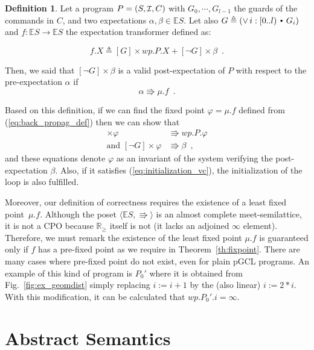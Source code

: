 \documentclass{eptcs}
\theoremstyle{plain}
\theoremstyle{definition}
\newtheorem{definition}[theorem]{Definition}
\newcommand{\Real}{\ensuremath{\mathbb R}}
\newcommand{\RealPos}{\ensuremath{\Real_\geq}}
\newcommand{\lit}[1]{\ensuremath{\mathit{#1}}}
\newcommand{\Init}{\mbox{\small\ensuremath{\mathcal{I}}}}
\newcommand{\totype}{\ensuremath{\ra}}
\newcommand{\ES}{\lit{\mathbb{E}S}}
\newcommand{\Def}{\ensuremath{\triangleq}}
\newcommand{\ra}{\ensuremath{\rightarrow}}
\newcommand{\dotsep}{\mbox{\raisebox{0.4ex}{\tiny\ensuremath{\:\;\bullet\;\:}}}}
\newcommand{\Not}{\ensuremath{\neg}}
\newcommand{\Wp}{\lit{wp}}
\newcommand{\elq}{\ensuremath{\Rrightarrow}}
\newcommand{\noi}[0]{\noindent}
\begin{document}
\begin{definition}
  Let a program $P = (S, \Init, C)$ with $G_0,\cdots, G_{l-1}$ the guards of the
  commands in $C$, and two expectations $\alpha, \beta \in \ES$. Let also $G \Def (\vee
  \, i : [0..l) \dotsep G_i)$ and $f : \ES \totype \ES$ the expectation
    transformer defined as:

  \begin{equation} \label{eq:back_propag_def}
    f.X \Def [G] \times \Wp.P.X + [\Not G] \times \beta \enspace.
  \end{equation}


  \noi Then, we said that $[\Not G]\times\beta$ is a valid \mbox{post-expectation} of $P$ with
  respect to the \mbox{pre-expectation} $\alpha$ if
  \begin{equation} \label{eq:initialization_vc}
    \alpha \elq \mu.f \enspace.
  \end{equation}
\end{definition}

\smallskip

Based on this definition, if we can find the fixed point $\varphi = \mu.f$
defined from (\ref{eq:back_propag_def}) then we can show that 
\begin{align*}
            [G] \times \varphi &\elq \Wp.P.\varphi\\
\text{and } [\Not G] \times \varphi &\elq \beta \enspace,
\end{align*}
and these equations denote $\varphi$ as an invariant of
the system verifying the \mbox{post-expectation} $\beta$. Also, if it
satisfies (\ref{eq:initialization_vc}), the initialization of the loop
is also fulfilled.

\smallskip
Moreover, our definition of correctness requires the existence of a least fixed
point~$\mu.f$. Although the poset $\langle \ES, \elq \rangle$ is an almost
complete \mbox{meet-semilattice}, it is not a CPO because $\RealPos$ itself is not
(it lacks an adjoined $\infty$ element). Therefore, we must remark the
existence of the least fixed point $\mu.f$ is guaranteed only if $f$ has a
\mbox{pre-fixed} point as we require in Theorem~\ref{th:fixpoint}. There are
many cases where \mbox{pre-fixed} point do not exist, even for plain
pGCL programs. An example of this kind of program is $P_0'$ where it is obtained from
Fig.~\ref{fig:ex_geomdist} simply replacing $i:=i+1$ by the (also linear)
$i:=2*i$.
With this modification, it can be calculated that $\Wp.P_0'.i = \infty$.


\section{Abstract Semantics}\label{abstract_semantics}
\end{document}
